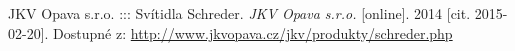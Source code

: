 \begin{thebibliography}{1}

JKV Opava s.r.o. ::: Svítidla Schreder. \textit{JKV Opava s.r.o.} [online]. 2014 [cit. 2015-02-20]. Dostupné z: \url{http://www.jkvopava.cz/jkv/produkty/schreder.php}

\end{thebibliography}